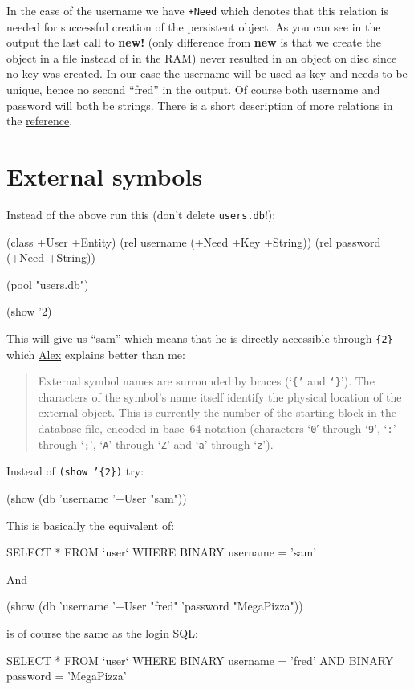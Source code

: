 In the case of the username we have \texttt{+Need} which denotes that
this relation is needed for successful creation of the persistent
object. As you can see in the output the last call to \textbf{new!}
(only difference from \textbf{new} is that we create the object in a
file instead of in the RAM) never resulted in an object on disc since
no key was created. In our case the username will be used as key and
needs to be unique, hence no second ``fred'' in the output. Of course
both username and password will both be strings. There is a short
description of more relations in the
\href{http://www.software-lab.de/ref.html#dbase}{reference}.

\section{External symbols}
\label{sec:simple-oodb-external-symbols}

Instead of the above run this (don't delete \texttt{users.db}!):

\begin{wideverbatim}
(class +User +Entity)
(rel username (+Need +Key +String))
(rel password (+Need +String))

(pool "users.db")

(show '{2})
\end{wideverbatim}


This will give us ``sam'' which means that he is directly accessible
through \texttt{\{2\}} which
\href{http://www.software-lab.de/ref.html#external-io}{Alex} explains
better than me:

\begin{quote}
  External symbol names are surrounded by braces (`\texttt{\{'} and
  \texttt{`\}}'). The characters of the symbol's name itself identify
  the physical location of the external object. This is currently the
  number of the starting block in the database file, encoded in
  base--64 notation (characters `\texttt{0}′ through `\texttt{9}',
  `\texttt{:}' through `\texttt{;}', `\texttt{A}' through `\texttt{Z}'
  and `\texttt{a}' through `\texttt{z}').
\end{quote}

Instead of \texttt{(show '\{2\})} try:


\begin{wideverbatim}
(show (db 'username '+User "sam"))
\end{wideverbatim}

This is basically the equivalent of:

\begin{wideverbatim}
SELECT * FROM `user` WHERE BINARY username = 'sam'
\end{wideverbatim}

And

\begin{wideverbatim}
(show (db 'username '+User "fred" 'password "MegaPizza"))
\end{wideverbatim}

is of course the same as the login SQL:

\begin{wideverbatim}
SELECT * FROM `user` WHERE BINARY username = 'fred' 
AND BINARY password = 'MegaPizza'
\end{wideverbatim}
